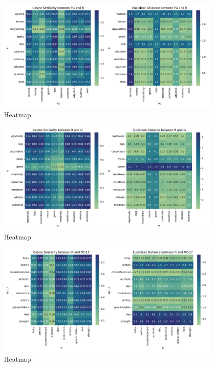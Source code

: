 \documentclass[a4paper]{article}
\begin{document}
\begin{figure}[ht]
    \centering
    \includegraphics[width=1\textwidth]{../stats/HeatMap_PG_R.png}
    \caption{Heatmap}
\end{figure}

\begin{figure}[ht]
    \centering
    \includegraphics[width=1\textwidth]{../stats/HeatMap_R_G.png}
    \caption{Heatmap}
\end{figure}

\begin{figure}[ht]
    \centering
    \includegraphics[width=1\textwidth]{../stats/HeatMap_R_NC-17.png}
    \caption{Heatmap}
\end{figure}
\end{document}
